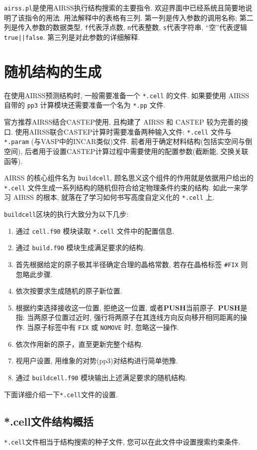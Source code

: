 \documentclass[a4paper, 10pt]{article}
\begin{document}
\verb|airss.pl|是使用AIRSS执行结构搜索的主要指令. 欢迎界面中已经系统且简要地说明了该指令的用法. 用法解释中的表格有三列. 第一列是传入参数的调用名称; 第二列是传入参数的数据类型, \verb|f|代表浮点数, \verb|n|代表整数, \verb|s|代表字符串, ``空''代表逻辑\verb!true||false!. 第三列是对此参数的详细解释.

\newpage
\section{随机结构的生成}
在使用AIRSS预测结构时, 一般需要准备一个 \verb|*.cell| 的文件. 如果要使用 AIRSS 自带的 \verb|pp3| 计算模块还需要准备一个名为 \verb|*.pp| 文件.

官方推荐AIRSS结合CASTEP使用, 且构建了 AIRSS 和 CASTEP 较为完善的接口. 使用AIRSS联合CASTEP计算时需要准备两种输入文件: \verb|*.cell| 文件与 \verb|*.param| (与VASP中的INCAR类似)文件. 前者用于确定材料结构(包括实空间与倒空间), 后者用于设置CASTEP计算过程中需要使用的配置参数(截断能, 交换关联函等).

AIRSS 的核心组件名为 \verb|buildcell|, 顾名思义这个组件的作用就是依据用户给出的 \verb|*.cell| 文件生成一系列结构的随机但符合给定物理条件约束的结构. 如此一来学习 AIRSS 的根本, 就落在了学习如何书写高度自定义化的 \verb|*.cell| 上.

\verb|buildcell|区块的执行大致分为以下几步:
\begin{enumerate}[-i-]
  \item 通过 \verb|cell.f90| 模块读取 \verb|*.cell| 文件中的配置信息.
  \item 通过 \verb|build.f90| 模块生成满足要求的结构.
  \item 首先根据给定的原子极其半径确定合理的晶格常数, 若存在晶格标签 \verb|#FIX| 则忽略此步骤.
  \item 依次按要求生成随机的原子新位置.
  \item 根据约束选择接收这一位置, 拒绝这一位置, 或者\textbf{PUSH}当前原子. \textbf{PUSH}是指: 当两原子位置过近时, 强行将两原子在其连线方向反向移开相同距离的操作. 当原子标签中有 \verb|FIX| 或 \verb|NOMOVE| 时, 忽略这一操作.
  \item 依次作用新的原子，直至更新完整个结构.
  \item 视用户设置, 用维象的对势(pp3)对结构进行简单弛豫.
  \item 通过 \verb|buildcell.f90| 模块输出上述满足要求的随机结构.
  \end{enumerate}

下面详细介绍一下\verb|*.cell|文件的设置. 

\subsection{*.cell文件结构概括}
\verb|*.cell|文件相当于结构搜索的种子文件, 您可以在此文件中设置搜索约束条件.
\end{document}

